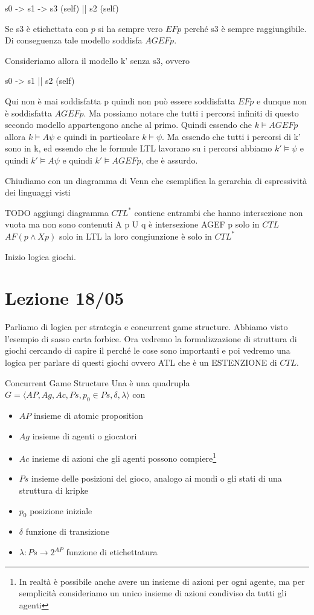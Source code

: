 s0 -> s1 -> s3 (self)
      ||
      s2 (self)

Se s3 è etichettata con \(p\) si ha sempre vero \(EFp\) perché s3 è sempre raggiungibile. Di conseguenza tale modello soddisfa \(AG EFp\).

Consideriamo allora il modello k' senza s3, ovvero

s0 -> s1
      ||
      s2 (self)

Qui non è mai soddisfatta p quindi non può essere soddisfatta \(EFp\) e dunque non è soddisfatta \(AG EFp\).
Ma possiamo notare che tutti i percorsi infiniti di questo secondo modello appartengono anche al primo.
Quindi essendo che \(k\models AGEFp\) allora \(k \models A\psi\) e quindi in particolare \(k\models \psi\). Ma essendo che tutti i percorsi di k' sono in k, ed essendo che le formule LTL lavorano su i percorsi abbiamo \(k' \models \psi\) e quindi \(k' \models A\psi\) e quindi \(k' \models AGEFp\), che è assurdo.

Chiudiamo con un diagramma di Venn che esemplifica la gerarchia di espressività dei linguaggi visti

TODO aggiungi diagramma 
\(CTL^*\) contiene entrambi che hanno intersezione non vuota ma non sono contenuti
A p U q è intersezione
AGEF p solo in \(CTL\)
\(AF(p \land Xp)\) solo in LTL
la loro congiunzione è solo in \(CTL^*\)

Inizio logica giochi.

\chapter{Lezione 18/05}

Parliamo di logica per strategia e concurrent game structure. Abbiamo visto l'esempio di sasso carta forbice. Ora vedremo la formalizzazione di struttura di giochi cercando di capire il perché le cose sono importanti e poi vedremo una logica per parlare di questi giochi ovvero ATL che è un ESTENZIONE di \(CTL\)\@.

\begin{definition}{Concurrent Game Structure}
  Una  è una quadrupla \(G=\langle AP, Ag, Ac,Ps, p_0 \in Ps, \delta, \lambda \rangle\) con
\begin{itemize}
  \item \(AP\) insieme di atomic proposition
  \item \(Ag\) insieme di agenti o giocatori
  \item \(Ac\) insieme di azioni che gli agenti possono compiere\footnote{In realtà è possibile anche avere un insieme di azioni per ogni agente, ma per semplicità consideriamo un unico insieme di azioni condiviso da tutti gli agenti}
  \item \(Ps\) insieme delle posizioni del gioco, analogo ai mondi o gli stati di una struttura di kripke
  \item \(p_0\) posizione iniziale
  \item \(\delta\) funzione di transizione
  \item \(\lambda: Ps \to 2^{AP}\) funzione di etichettatura
\end{itemize}

\end{definition}

